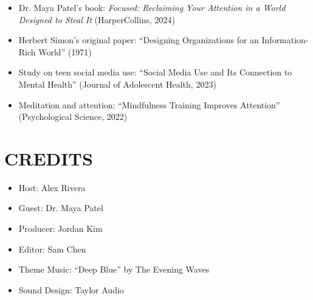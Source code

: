 \documentclass[
    language=english,
    doctype=podcast-script,
    institution=none,
]{../../omnilatex}
\begin{document}
\begin{itemize}
    \item Dr. Maya Patel's book: \textit{Focused: Reclaiming Your Attention in a World Designed to Steal It} (HarperCollins, 2024)
    \item Herbert Simon's original paper: ``Designing Organizations for an Information-Rich World'' (1971)
    \item Study on teen social media use: ``Social Media Use and Its Connection to Mental Health'' (Journal of Adolescent Health, 2023)
    \item Meditation and attention: ``Mindfulness Training Improves Attention'' (Psychological Science, 2022)
\end{itemize}

\section*{CREDITS}

\begin{itemize}
    \item Host: Alex Rivera
    \item Guest: Dr. Maya Patel
    \item Producer: Jordan Kim
    \item Editor: Sam Chen
    \item Theme Music: ``Deep Blue'' by The Evening Waves
    \item Sound Design: Taylor Audio
\end{itemize}
\end{document}
